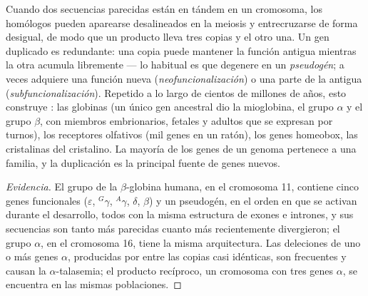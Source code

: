 \begin{proposition}\label{prop:b2:genome-diversification:duplication}
Cuando dos secuencias parecidas están en tándem en un cromosoma, los
homólogos pueden aparearse desalineados en la meiosis y entrecruzarse de
forma desigual, de modo que un producto lleva tres copias y el otro una.
Un gen duplicado es redundante: una copia puede mantener la función
antigua mientras la otra acumula  libremente --- lo habitual es
que degenere en un \emph{pseudogén}; a veces adquiere una función nueva
(\emph{neofuncionalización}) o una parte de la antigua
(\emph{subfuncionalización}). Repetido a lo largo de cientos de millones
de años, esto construye \emph{}: las globinas (un único
gen ancestral dio la mioglobina, el grupo $\alpha$ y el grupo
$\beta$, con miembros embrionarios, fetales y adultos que se expresan
por turnos), los receptores olfativos (mil genes en un ratón), los genes
homeobox, las cristalinas del cristalino. La mayoría de los genes de un
genoma pertenece a una familia, y la duplicación es la principal fuente
de genes nuevos.
\end{proposition}
\begin{proof}[Evidencia]
El grupo de la $\beta$-globina humana, en el cromosoma 11, contiene cinco
genes funcionales ($\varepsilon$, $^{G}\gamma$, $^{A}\gamma$,
$\delta$, $\beta$) y un pseudogén, en el orden en que se activan durante
el desarrollo, todos con la misma estructura de exones e intrones, y sus
secuencias son tanto más parecidas cuanto más recientemente divergieron;
el grupo $\alpha$, en el cromosoma 16, tiene la misma arquitectura. Las
deleciones de uno o más genes $\alpha$, producidas por  entre las copias casi idénticas, son frecuentes y causan la
$\alpha$-talasemia; el producto recíproco, un cromosoma con tres genes
$\alpha$, se encuentra en las mismas poblaciones.
\end{proof}

